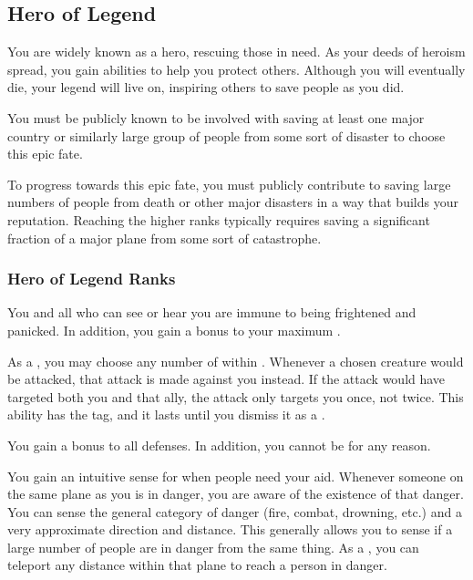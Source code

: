   \subsection{Hero of Legend}
    You are widely known as a hero, rescuing those in need.
    As your deeds of heroism spread, you gain abilities to help you protect others.
    Although you will eventually die, your legend will live on, inspiring others to save people as you did.

     You must be publicly known to be involved with saving at least one major country or similarly large group of people from some sort of disaster to choose this epic fate.

     To progress towards this epic fate, you must publicly contribute to saving large numbers of people from death or other major disasters in a way that builds your reputation.
    Reaching the higher ranks typically requires saving a significant fraction of a major plane from some sort of catastrophe.

    \subsubsection{Hero of Legend Ranks}
       You and all  who can see or hear you are immune to being frightened and panicked.
      In addition, you gain a  bonus to your maximum .

       As a , you may choose any number of  within \longrange.
      Whenever a chosen creature would be attacked, that attack is made against you instead.
      If the attack would have targeted both you and that ally, the attack only targets you once, not twice.
      This ability has the  tag, and it lasts until you dismiss it as a .

       You gain a  bonus to all defenses.
      In addition, you cannot be \vulnerable for any reason.

       You gain an intuitive sense for when people need your aid.
      Whenever someone on the same plane as you is in danger, you are aware of the existence of that danger.
      You can sense the general category of danger (fire, combat, drowning, etc.) and a very approximate direction and distance.
      This generally allows you to sense if a large number of people are in danger from the same thing.
      As a , you can teleport any distance within that plane to reach a person in danger.

